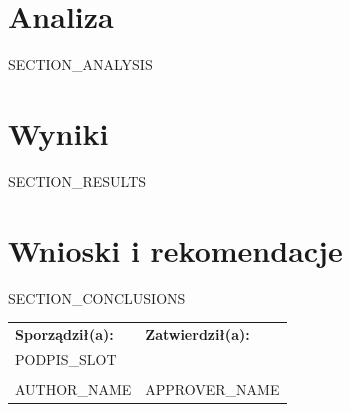 \documentclass[a4paper,12pt]{article}
\begin{document}
\section{Analiza}
{{SECTION_ANALYSIS}}

\section{Wyniki}
{{SECTION_RESULTS}}

\section{Wnioski i rekomendacje}
{{SECTION_CONCLUSIONS}}

\vskip 1.5cm
\noindent
\begin{tabular}{@{}p{7cm}p{7cm}@{}}
\textbf{Sporządził(a):} & \textbf{Zatwierdził(a):} \\
{{PODPIS_SLOT}} & \\[-3mm]
\dotfill & \dotfill \\
{{AUTHOR_NAME}} & {{APPROVER_NAME}} \\
\end{tabular}
\end{document}
